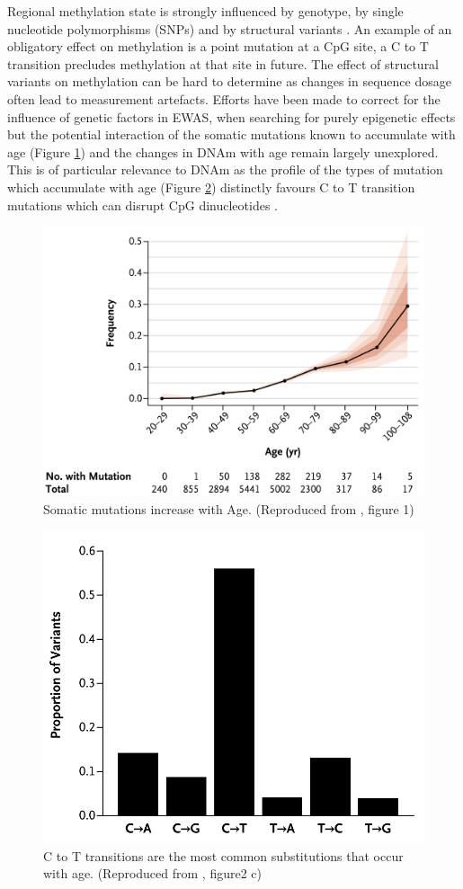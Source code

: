 \documentclass[]{book}
\begin{document}
Regional methylation state is strongly influenced by genotype, by single nucleotide polymorphisms (SNPs) \citep{Smith2014a} and by structural variants \citep{Bell2017a}. An example of an obligatory effect on methylation is a point mutation at a CpG site, a C to T transition precludes methylation at that site in future. The effect of structural variants on methylation can be hard to determine as changes in sequence dosage often lead to measurement artefacts. Efforts have been made to correct for the influence of genetic factors in EWAS, when searching for purely epigenetic effects but the potential interaction of the somatic mutations known to accumulate with age (Figure \ref{fig:Jaiswal2014fig1}) and the changes in DNAm with age remain largely unexplored. This is of particular relevance to DNAm as the profile of the types of mutation which accumulate with age (Figure \ref{fig:Jaiswal2014fig2c}) distinctly favours C to T transition mutations which can disrupt CpG dinucleotides \citep{Jaiswal2014c}.

\begin{figure}

{\centering \includegraphics[width=0.6\linewidth]{figs/Jaiswal2014fig1_somaticMutationAge} 

}

\caption{Somatic mutations increase with Age.
(Reproduced from \citep{Jaiswal2014c}, figure 1)}\label{fig:Jaiswal2014fig1}
\end{figure}




\begin{figure}

{\centering \includegraphics[width=0.6\linewidth]{figs/Jaiswal2014fig2c} 

}

\caption{C to T transitions are the most common substitutions that occur with age.
(Reproduced from \citep{Jaiswal2014c}, figure2 c)}\label{fig:Jaiswal2014fig2c}
\end{figure}
\end{document}
